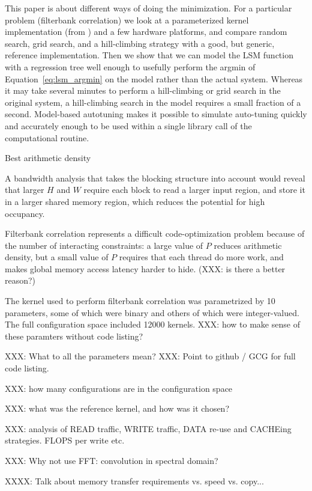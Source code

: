 This paper is about different ways of doing the minimization.
For a particular problem (filterbank correlation) we
look at a parameterized kernel implementation (from \citet{pinto+cox:2011gcg})
and a few hardware platforms, and compare
random search, grid search, and a hill-climbing strategy with a good, but
generic, reference implementation.
Then we show that we can model the LSM function with a regression tree
well enough to usefully perform the argmin of Equation~\ref{eq:lsm_argmin}
on the model rather than the actual system. Whereas it may take several
minutes to perform a hill-climbing or grid search in the original system,
a hill-climbing search in the model requires a small fraction of a second.
Model-based autotuning makes it possible to simulate auto-tuning quickly and
accurately enough to be used within a single library call of the computational
routine.

Best arithmetic density

A bandwidth analysis that takes the blocking structure into account would
reveal that larger $H$ and $W$ require each block to read a larger input
region, and store it in a larger shared memory region, which reduces the
potential for high occupancy.

Filterbank correlation represents a difficult code-optimization problem
because of the number of interacting constraints: a large value of $P$ reduces
arithmetic density, but a small value of $P$ requires that each thread do more
work, and makes global memory access latency harder to hide. (XXX: is there a
better reason?)


The kernel used to perform
filterbank correlation was parametrized by 10 parameters, some of which
were binary and others of which were integer-valued. The full configuration
space included 12000 kernels.
XXX: how to make sense of these paramters without code listing?

XXX: What to all the parameters mean?
XXX: Point to github / GCG for full code listing.

XXX: how many configurations are in the configuration space

XXX: what was the reference kernel, and how was it chosen?

XXX: analysis of READ traffic, WRITE traffic, DATA re-use and CACHEing
strategies. FLOPS per write etc.

XXX: Why not use FFT: convolution in spectral domain?

XXXX: Talk about memory transfer requirements vs. speed vs. copy...

